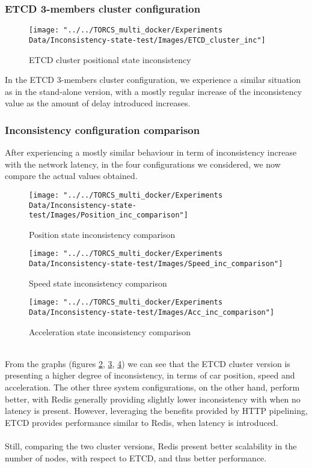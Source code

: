 \subsubsection{ETCD 3-members cluster configuration}
\begin{figure}[h!]
	\centering
	\texttt{[image: "../../TORCS\_multi\_docker/Experiments Data/Inconsistency-state-test/Images/ETCD\_cluster\_inc"]}
	\caption[ETCD cluster positional state inconsistency]{ETCD cluster positional state inconsistency}
	\label{fig:etcd-cluster-inconsistency}
\end{figure}
In the ETCD 3-members cluster configuration, we experience a similar situation as in the stand-alone version, with a mostly regular increase of the inconsistency value as the amount of delay introduced increases.

\subsubsection{Inconsistency configuration comparison}
After experiencing a mostly similar behaviour in term of inconsistency increase with the network latency, in the four configurations we considered, we now compare the actual values obtained.
\begin{figure}[h!]
	\centering
	\texttt{[image: "../../TORCS\_multi\_docker/Experiments Data/Inconsistency-state-test/Images/Position\_inc\_comparison"]}
	\caption[Position state inconsistency comparison]{Position state inconsistency comparison}
	\label{fig:position-inconsistency-comparison}
\end{figure}
\begin{figure}[h!]
	\centering
	\texttt{[image: "../../TORCS\_multi\_docker/Experiments Data/Inconsistency-state-test/Images/Speed\_inc\_comparison"]}
	\caption[Speed state inconsistency comparison]{Speed state inconsistency comparison}
	\label{fig:speed-inconsistency-comparison}
\end{figure}
\begin{figure}[h!]
	\centering
	\texttt{[image: "../../TORCS\_multi\_docker/Experiments Data/Inconsistency-state-test/Images/Acc\_inc\_comparison"]}
	\caption[Acceleration state inconsistency comparison]{Acceleration state inconsistency comparison}
	\label{fig:acceleration-inconsistency-comparison}
\end{figure}
\\ From the graphs (figures \ref{fig:position-inconsistency-comparison}, \ref{fig:speed-inconsistency-comparison}, \ref{fig:acceleration-inconsistency-comparison}) we can see that the ETCD cluster version is presenting a higher degree of inconsistency, in terms of car position, speed and acceleration. The other three system configurations, on the other hand, perform better, with Redis generally providing slightly lower inconsistency with when no latency is present. However, leveraging the benefits provided by HTTP pipelining, ETCD provides performance similar to Redis, when latency is introduced. \\ \\
Still, comparing the two cluster versions, Redis present better scalability in the number of nodes, with respect to ETCD, and thus better performance.